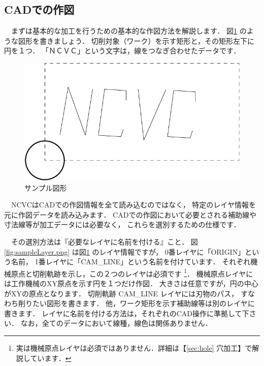 
\label{sec:basic}

\subsection{CADでの作図}
\label{sec:DesignCAD}

\begin{minipage}[t]{0.4\textwidth}
　まずは基本的な加工を行うための基本的な作図方法を解説します．
図\ref{fig:sample1.jww} のような図形を書きましょう．
切削対象（ワーク）を示す矩形と，その矩形左下に円を１つ．
「ＮＣＶＣ」という文字は，線をつなぎ合わせたデータです．
\end{minipage}
\begin{minipage}[t]{0.6\textwidth}
\vspace*{-2zh}
\begin{figure}[H]
\centering
\includegraphics[scale=0.8]{No2/fig/sample1.pdf}
\caption{サンプル図形}
\label{fig:sample1.jww}
\end{figure}
\end{minipage}

\vspace*{2zh}
　NCVCはCADでの作図情報を全て読み込むのではなく，
特定のレイヤ情報を元に作図データを読み込みます．
CADでの作図において必要とされる補助線や寸法線等が加工データには必要なく，
これらを選別するための仕様です．

　その選別方法は『必要なレイヤに名前を付ける』こと．
図\ref{fig:sampleLayer.png} は図\ref{fig:sample1.jww} のレイヤ情報ですが，
0番レイヤに「ORIGIN」という名前，
1番レイヤに「CAM\_LINE」という名前を付けています．
それぞれ機械原点と切削軌跡を示し，この２つのレイヤは必須です
\footnote{実は機械原点レイヤは必須ではありません．詳細は【\ref{sec:hole} 穴加工】で解説しています．}．
機械原点レイヤには工作機械のXY原点を示す円を１つだけ作図．
大きさは任意ですが，円の中心がXYの原点となります．
切削軌跡 CAM\_LINE レイヤには刃物のパス，
すなわち削りたい図形を書きます．
他，ワーク矩形を示す補助線等は別のレイヤに書きます．
レイヤに名前を付ける方法は，それぞれのCAD操作に準拠して下さい．
なお，全てのデータにおいて線種，線色は関係ありません．

